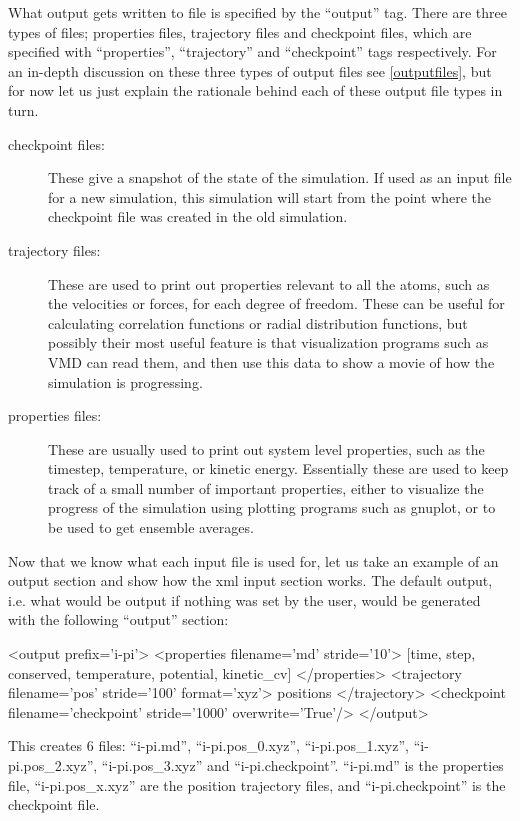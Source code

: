 \documentclass[11pt,english,fleqn]{report}
\newenvironment{code}{%
\footnotesize 
\verbatim
}{
\endverbatim
\normalsize
}
\begin{document}
What output gets written to file is specified by the {}``output'' tag.
There are three types of files;
properties files, trajectory files and checkpoint files, which 
are specified with {}``properties'', {}``trajectory'' 
and {}``checkpoint'' tags respectively.
For an in-depth discussion on these three types
of output files see \ref{outputfiles}, 
but for now let us just explain the rationale
behind each of these output file types in turn.

\begin{description}
\item[checkpoint files:]
These give a snapshot of the state of the simulation.
If used as an input file for a new \ipi simulation,
this simulation will start from the point where the
checkpoint file was created in the old simulation.
\item[trajectory files:] 
These are used to print out properties
relevant to all the atoms, such as the velocities or forces, for each degree of freedom.
These can be useful
for calculating correlation functions or radial distribution functions,
but possibly their most useful feature is that visualization
programs such as VMD can read them, and then use this data to show
a movie of how the simulation is progressing. 
\item[properties files:] 
These are usually used to print out
system level properties, such as the timestep, temperature,
or kinetic energy. Essentially these are used to keep track of a small
number of important properties, either to visualize the
progress of the simulation using plotting programs such as gnuplot, 
or to be used to get ensemble averages.
\end{description}

Now that we know what each input file is used for, let us take an
example of an output section and show how the xml input section works.
The default output, i.e. what would be output if nothing was set by the user, 
would be generated with the following {}``output'' section:

\begin{code}
<output prefix='i-pi'>
   <properties filename='md' stride='10'>
      [time, step, conserved, temperature, potential, kinetic_cv]
   </properties>
   <trajectory filename='pos' stride='100' format='xyz'>
      positions
   </trajectory>
   <checkpoint filename='checkpoint' stride='1000' overwrite='True'/>
</output>
\end{code}

This creates 6 files: {}``i-pi.md'', {}``i-pi.pos\_0.xyz'',
{}``i-pi.pos\_1.xyz'', {}``i-pi.pos\_2.xyz'', {}``i-pi.pos\_3.xyz''
and {}``i-pi.checkpoint''. 
{}``i-pi.md'' is the properties file, {}``i-pi.pos\_x.xyz'' are the
position trajectory files, and {}``i-pi.checkpoint'' is the
checkpoint file.
\end{document}
